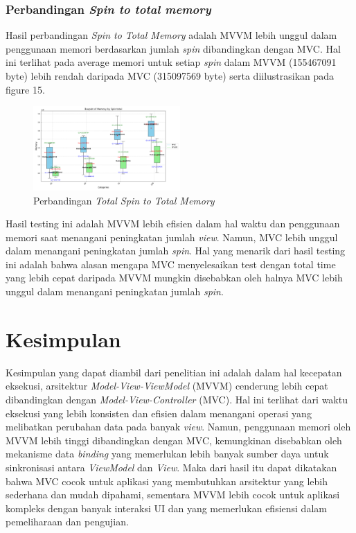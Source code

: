 \documentclass[conference]{IEEEtran}
\begin{document}
	\vspace{3cm}
	
	\subsubsection{Perbandingan \textit{Spin to total memory}}
	Hasil perbandingan \textit{Spin to Total Memory} adalah MVVM lebih unggul dalam penggunaan memori berdasarkan jumlah \textit{spin} dibandingkan dengan MVC. Hal ini terlihat pada average memori untuk setiap \textit{spin} dalam MVVM (155467091 byte) lebih rendah daripada MVC (315097569 byte) serta diilustrasikan pada figure 15.
	
	\begin{figure}[h]
		\centering
		\includegraphics[width=0.5\textwidth]{../mvc-mvvm/plot_spin_total_memory.pdf}
		\caption{Perbandingan \textit{Total Spin to Total Memory}}
		\label{fig:total_spin_to_total_memory}
	\end{figure}
	
	Hasil testing ini adalah MVVM lebih efisien dalam hal waktu dan penggunaan memori saat menangani peningkatan jumlah \textit{view}. Namun, MVC lebih unggul dalam menangani peningkatan jumlah \textit{spin}. Hal yang menarik dari hasil testing ini adalah bahwa alasan mengapa MVC menyelesaikan test dengan total time yang lebih cepat daripada MVVM mungkin disebabkan oleh halnya MVC lebih unggul dalam menangani peningkatan jumlah \textit{spin}.
	
	
	\section{Kesimpulan}
	Kesimpulan yang dapat diambil dari penelitian ini adalah dalam hal kecepatan eksekusi, arsitektur \textit{Model-View-ViewModel} (MVVM) cenderung lebih cepat dibandingkan dengan \textit{Model-View-Controller} (MVC). Hal ini terlihat dari waktu eksekusi yang lebih konsisten dan efisien dalam menangani operasi yang melibatkan perubahan data pada banyak \textit{view}. Namun, penggunaan memori oleh MVVM lebih tinggi dibandingkan dengan MVC, kemungkinan disebabkan oleh mekanisme data \textit{binding} yang memerlukan lebih banyak sumber daya untuk sinkronisasi antara \textit{ViewModel} dan \textit{View}. Maka dari hasil itu dapat dikatakan bahwa MVC cocok untuk aplikasi yang membutuhkan arsitektur yang lebih sederhana dan mudah dipahami, sementara MVVM lebih cocok untuk aplikasi kompleks dengan banyak interaksi UI dan yang memerlukan efisiensi dalam pemeliharaan dan pengujian.
	
\end{document}
